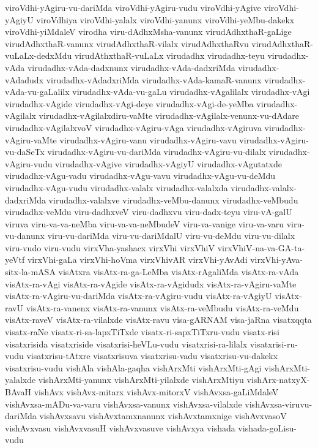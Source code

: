 {viroVdhi-yAgiru-vu-dariMda
viroVdhi-yAgiru-vudu
viroVdhi-yAgive
viroVdhi-yAgiyU
viroVdhiya
viroVdhi-yalalx
viroVdhi-yanunx
viroVdhi-yeMbu-dakekx
viroVdhi-yiMdaleV
virodha
viru-dAdhxMsha-vanunx
virudAdhxthaR-gaLige
virudAdhxthaR-vanunx
virudAdhxthaR-vilalx
virudAdhxthaRvu
virudAdhxthaR-vuLaLx-dedxMdu
virudAthxthaR-vuLaLx
virudadhx
virudadhx-teyu
virudadhx-vAda
virudadhx-vAda-dadxnunx
virudadhx-vAda-dadxriMda
virudadhx-vAdadudx
virudadhx-vAdadxriMda
virudadhx-vAda-kamaR-vanunx
virudadhx-vAda-vu-gaLalilx
virudadhx-vAda-vu-gaLu
virudadhx-vAgalilalx
virudadhx-vAgi
virudadhx-vAgide
virudadhx-vAgi-deye
virudadhx-vAgi-de-yeMba
virudadhx-vAgilalx
virudadhx-vAgilalxdiru-vaMte
virudadhx-vAgilalx-venunx-vu-dAdare
virudadhx-vAgilalxvoV
virudadhx-vAgiru-vAga
virudadhx-vAgiruva
virudadhx-vAgiru-vaMte
virudadhx-vAgiru-vanu
virudadhx-vAgiru-vavu
virudadhx-vAgiru-vu-daSeTx
virudadhx-vAgiru-vu-dariMda
virudadhx-vAgiru-vu-dilalx
virudadhx-vAgiru-vudu
virudadhx-vAgive
virudadhx-vAgiyU
virudadhx-vAgutatxde
virudadhx-vAgu-vadu
virudadhx-vAgu-vavu
virudadhx-vAgu-vu-deMdu
virudadhx-vAgu-vudu
virudadhx-valalx
virudadhx-valalxda
virudadhx-valalx-dadxriMda
virudadhx-valalxve
virudadhx-veMbu-danunx
virudadhx-veMbudu
virudadhx-veMdu
viru-dadhxveV
viru-dadhxvu
viru-dadx-teyu
viru-vA-galU
viruva
viru-va-va-neMba
viru-va-va-neMbudeV
viru-va-vanige
viru-va-varu
viru-vu-danunx
viru-vu-dariMda
viru-vu-dariMdalU
viru-vu-deMdu
viru-vu-dilalx
viru-vudo
viru-vudu
virxVha-yashacx
virxVhi
virxVhiV
virxVhiV-na-va-GA-ta-yeVtf
virxVhi-gaLa
virxVhi-hoVma
virxVhivAR
virxVhi-yAvAdi
virxVhi-yAva-sitx-la-mASA
visAtxra
visAtx-ra-ga-LeMba
visAtx-rAgaliMda
visAtx-ra-vAda
visAtx-ra-vAgi
visAtx-ra-vAgide
visAtx-ra-vAgidudx
visAtx-ra-vAgiru-vaMte
visAtx-ra-vAgiru-vu-dariMda
visAtx-ra-vAgiru-vudu
visAtx-ra-vAgiyU
visAtx-ravU
visAtx-ra-vanenx
visAtx-ra-vanunx
visAtx-ra-veMbudu
visAtx-ra-veMdu
visAtx-raveV
visAtx-ra-vilalxde
visAtx-ravu
visa-gARNAM
visa-jaRna
visatxqqta
visatx-raNe
visatx-ri-sa-lapxTiTxde
visatx-ri-sapxTiTxru-vudu
visatx-risi
visatxrisida
visatxriside
visatxrisi-heVLu-vudu
visatxrisi-ra-lilalx
visatxrisi-ru-vudu
visatxrisu-tAtxre
visatxrisuva
visatxrisu-vadu
visatxrisu-vu-dakekx
visatxrisu-vudu
vishAla
vishAla-gaqha
vishArxMti
vishArxMti-gAgi
vishArxMti-yalalxde
vishArxMti-yanunx
vishArxMti-yilalxde
vishArxMtiyu
vishArx-natxyX-BAvaH
vishAvx
vishAvx-mitarx
vishAvx-mitorxV
vishAvxsa-gaLiMdaleV
vishAvxsa-mADu-va-varu
vishAvxsa-vanunx
vishAvxsa-vilalxde
vishAvxsa-viruvu-dariMda
vishAvxsavu
vishAvxtamxnanunx
vishAvxtamxnige
vishAvxvasoV
vishAvxvasu
vishAvxvasuH
vishAvxvasuve
vishAvxya
vishada
vishada-goLisu-vudu
}
